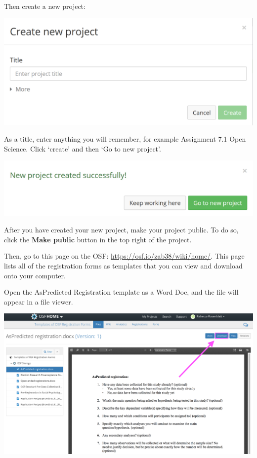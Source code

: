 \documentclass[
  oneside]{book}
\begin{document}
Then create a new project:

\begin{center}\includegraphics[width=1\linewidth]{images/2319f53e025e2b9c707f1062f478dc1a} \end{center}

As a title, enter anything you will remember, for example Assignment 7.1 Open
Science. Click `create' and then `Go to new project'.

\begin{center}\includegraphics[width=1\linewidth]{images/34c3f0068911af6749513b1584c4cac7} \end{center}

After you have created your new project, make your project public. To do so,
click the \textbf{Make public} button in the top right of the project.

Then, go to this page on the OSF: \url{https://osf.io/zab38/wiki/home/}. This page
lists all of the registration forms as templates that you can view and download
onto your computer.

Open the AsPredicted Registration template as a Word Doc, and the file will
appear in a file viewer.

\begin{center}\includegraphics[width=1\linewidth]{images/895c7caf7508910ae52cc2d09e06f31c} \end{center}
\end{document}
